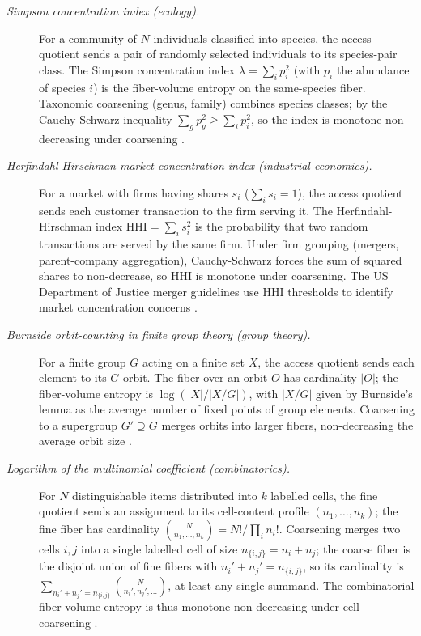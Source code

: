 \documentclass[11pt]{article}
\theoremstyle{definition}
\begin{document}
\begin{description}
\item[\emph{Simpson concentration index (ecology).}]
For a community of \(N\) individuals classified into
species, the access quotient sends a pair of randomly
selected individuals to its species-pair class.  The
Simpson concentration index
\(\lambda=\sum_i p_i^2\) (with \(p_i\) the abundance of
species \(i\)) is the fiber-volume entropy on the
same-species fiber.  Taxonomic coarsening (genus,
family) combines species classes; by the
Cauchy-Schwarz inequality
\(\sum_g p_g^2\ge\sum_i p_i^2\), so the index is
monotone non-decreasing under coarsening
\citep{Simpson1949Diversity}.

\item[\emph{Herfindahl-Hirschman market-concentration
index (industrial economics).}]
For a market with firms having shares \(s_i\)
(\(\sum_i s_i=1\)), the access quotient sends each
customer transaction to the firm serving it.  The
Herfindahl-Hirschman index
\(\mathrm{HHI}=\sum_i s_i^2\) is the probability that
two random transactions are served by the same firm.
Under firm grouping (mergers, parent-company
aggregation), Cauchy-Schwarz forces the sum of squared
shares to non-decrease, so HHI is monotone under
coarsening.  The US Department of Justice merger
guidelines use HHI thresholds to identify market
concentration concerns \citep{Hirschman1964HHI}.

\item[\emph{Burnside orbit-counting in finite group
theory (group theory).}]
For a finite group \(G\) acting on a finite set \(X\),
the access quotient sends each element to its
\(G\)-orbit.  The fiber over an orbit \(O\) has
cardinality \(|O|\); the fiber-volume entropy is
\(\log(|X|/|X/G|)\), with \(|X/G|\) given by
Burnside's lemma as the average number of fixed
points of group elements.  Coarsening to a supergroup
\(G'\supseteq G\) merges orbits into larger fibers,
non-decreasing the average orbit size
\citep{Burnside1897Theory}.

\item[\emph{Logarithm of the multinomial coefficient
(combinatorics).}]
For \(N\) distinguishable items distributed into \(k\)
labelled cells, the fine quotient sends an assignment
to its cell-content profile
\((n_1,\dots,n_k)\); the fine fiber has cardinality
\(\binom{N}{n_1,\dots,n_k}=N!/\prod_i n_i!\).
Coarsening merges two cells \(i,j\) into a single
labelled cell of size \(n_{\{i,j\}}=n_i+n_j\); the
coarse fiber is the disjoint union of fine fibers
with \(n_i'+n_j'=n_{\{i,j\}}\), so its cardinality is
\(\sum_{n_i'+n_j'=n_{\{i,j\}}}
\binom{N}{n_i',n_j',\dots}\), at least any single
summand.  The combinatorial fiber-volume entropy is
thus monotone non-decreasing under cell coarsening
\citep{Knuth1997TAOCP}.


\end{description}
\end{document}

